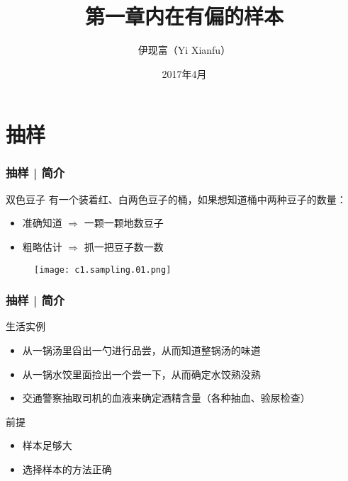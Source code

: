 



\title[抽样]{第一章\quad 内在有偏的样本}
\author[Yixf]{伊现富（Yi Xianfu）}
\date{2017年4月}



\section{抽样}
\begin{frame}
  \frametitle{抽样 | 简介}
  \begin{block}{双色豆子}
    有一个装着红、白两色豆子的桶，如果想知道桶中两种豆子的数量：
    \begin{itemize}
      \item 准确知道 $\Longrightarrow$ 一颗一颗地数豆子
      \item 粗略估计 $\Longrightarrow$ 抓一把豆子数一数
    \end{itemize}
  \end{block}
  \pause
  \begin{figure}
    \centering
    \texttt{[image: c1.sampling.01.png]}
  \end{figure}
\end{frame}

\begin{frame}
  \frametitle{抽样 | 简介}
  \begin{block}{生活实例}
    \begin{itemize}
      \item 从一锅汤里舀出一勺进行品尝，从而知道整锅汤的味道
      \item 从一锅水饺里面捡出一个尝一下，从而确定水饺熟没熟
      \item 交通警察抽取司机的血液来确定酒精含量（各种抽血、验尿检查）
    \end{itemize}
  \end{block}
  \pause
  \begin{block}{前提}
    \begin{itemize}
      \item 样本足够大
      \item 选择样本的方法正确
    \end{itemize}
  \end{block}
\end{frame}

